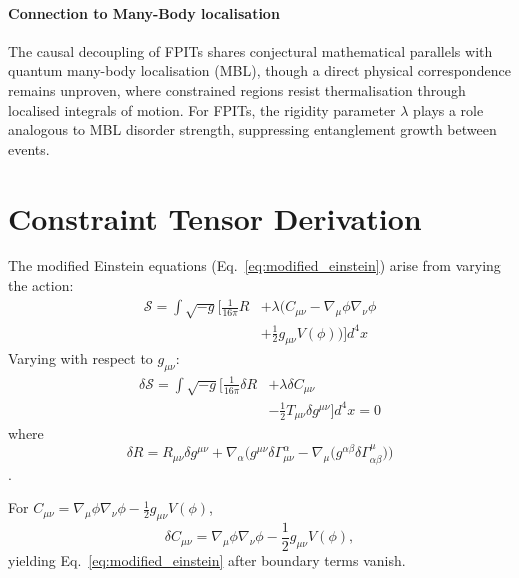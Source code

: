 \documentclass[twocolumn]{article}
\begin{document}
	\paragraph{Connection to Many-Body localisation}
	The causal decoupling of FPITs shares conjectural mathematical parallels with quantum many-body localisation (MBL)\cite{Huse2014}, though a direct physical correspondence remains unproven, where constrained regions resist thermalisation through localised integrals of motion. For FPITs, the rigidity parameter \(\lambda\) plays a role analogous to MBL disorder strength, suppressing entanglement growth between events.  
	
	
	\FloatBarrier%
	\section{Constraint Tensor Derivation}\label{app:constraint_deriv}
	
	The modified Einstein equations (Eq.~\ref{eq:modified_einstein}) arise from varying the action:  
	\begin{equation}
		\begin{split}
			\mathcal{S} = \int \sqrt{-g} \bigg[ \frac{1}{16\pi} R 
			&+ \lambda \bigg( C_{\mu\nu} - \nabla_\mu\phi\nabla_\nu\phi \\
			&+ \frac{1}{2}g_{\mu\nu}V(\phi) \bigg) \bigg] d^4x
		\end{split} 
	\end{equation}
	Varying with respect to \(g_{\mu\nu}\):  
	\begin{equation}
		\begin{split}
			\delta \mathcal{S} = \int \sqrt{-g} \bigg[ \frac{1}{16\pi} \delta R 
			&+ \lambda \delta C_{\mu\nu} \\
			&- \frac{1}{2} T_{\mu\nu} \delta g^{\mu\nu} \bigg] d^4x = 0
		\end{split}
	\end{equation}
	where 
	\begin{equation}
		\delta R = R_{\mu\nu} \delta g^{\mu\nu} + \nabla_\alpha \Big( g^{\mu\nu}\delta\Gamma^\alpha_{\mu\nu} 
		- \nabla_\mu \big( g^{\alpha\beta}\delta\Gamma^\mu_{\alpha\beta} \big) \Big)
	\end{equation}
	\cite{Wald1984}. 
	
	For \(C_{\mu\nu} = \nabla_\mu\phi\nabla_\nu\phi - \frac{1}{2}g_{\mu\nu}V(\phi)\),  
	\begin{equation}
		\delta C_{\mu\nu} = \nabla_\mu\phi\nabla_\nu\phi - \frac{1}{2}g_{\mu\nu}V(\phi), 
	\end{equation}
	yielding Eq.~\ref{eq:modified_einstein} after boundary terms vanish.  
	
\end{document}
